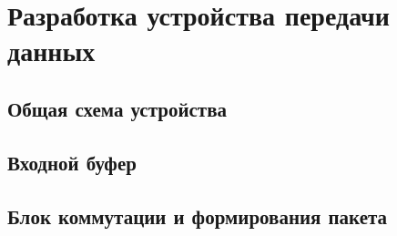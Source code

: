 %

%

\section{Разработка устройства передачи данных}

\subsection{Общая схема устройства}

\subsection{Входной буфер}

\subsection{Блок коммутации и формирования пакета}

